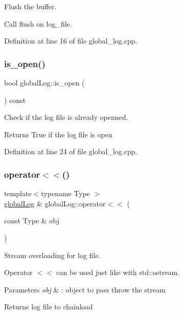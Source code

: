 Flush the buffer. 

Call flush on log\+\_\+file. 

Definition at line 16 of file global\+\_\+log.\+cpp.

\hypertarget{classglobal_log_aa666c04b1c1429ab765c7313060d9e39}{}\label{classglobal_log_aa666c04b1c1429ab765c7313060d9e39} 
\subsubsection{\texorpdfstring{is\+\_\+open()}{is\_open()}}
{\footnotesize\ttfamily bool global\+Log\+::is\+\_\+open (\begin{DoxyParamCaption}{ }\end{DoxyParamCaption}) const}



Check if the log file is already openned. 

\begin{DoxyReturn}{Returns}
True if the log file is open 
\end{DoxyReturn}


Definition at line 24 of file global\+\_\+log.\+cpp.

\hypertarget{classglobal_log_a1a8d6920fb45109bba411cf678e1e502}{}\label{classglobal_log_a1a8d6920fb45109bba411cf678e1e502} 
\subsubsection{\texorpdfstring{operator$<$$<$()}{operator<<()}\hspace{0.1cm}{\footnotesize\ttfamily [1/4]}}
{\footnotesize\ttfamily template$<$typename Type $>$ \\
\hyperlink{classglobal_log}{global\+Log} \& global\+Log\+::operator$<$$<$ (\begin{DoxyParamCaption}\item[{const Type \&}]{obj }\end{DoxyParamCaption})}



Stream overloading for log file. 

Operator $<$$<$ can be used just like with std\+::ostream.


\begin{DoxyParams}{Parameters}
{\em obj} & \+: object to pass throw the stream\\
\hline
\end{DoxyParams}
\begin{DoxyReturn}{Returns}
log file to chainload 
\end{DoxyReturn}


